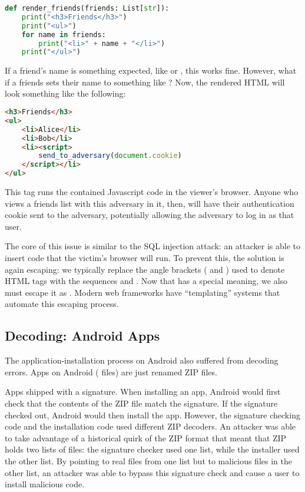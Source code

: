 \begin{lstlisting}[language=python]
def render_friends(friends: List[str]):
	print("<h3>Friends</h3>")
	print("<ul>")
	for name in friends:
		print("<li>" + name + "</li>")
	print("</ul>")
\end{lstlisting}

If a friend's name is something expected, like  or , this works fine. However, what if a friends sets their name to something like ? Now, the rendered HTML will look something like the following:

\begin{lstlisting}[language=html]
<h3>Friends</h3>	
<ul>
	<li>Alice</li>
	<li>Bob</li>
	<li><script>
		send_to_adversary(document.cookie)
	</script></li>
</ul>
\end{lstlisting}

This  tag runs the contained Javascript code in the viewer's browser. Anyone who views a friends list with this adversary in it, then, will have their authentication cookie sent to the adversary, potentially allowing the adversary to log in as that user.

The core of this issue is similar to the SQL injection attack: an attacker is
able to insert code that the victim's browser will run. To prevent this, the solution is again
escaping: we typically replace the angle brackets (\ttt{<} and \ttt{>}) used to denote HTML tags 
with the sequences  and . Now
that \ttt{&} has a special meaning, we also must escape it as .
Modern web frameworks have ``templating'' systems that automate this escaping process.


\subsection{Decoding: Android Apps}
The application-installation process on Android also suffered from decoding errors. Apps on Android ( files) are just renamed ZIP files.

Apps shipped with a signature. When installing an app, Android would first check that the contents of the ZIP file match the signature. If the signature checked out, Android would then install the app. However, the signature checking code and the installation code used different ZIP decoders. An attacker was able to take advantage of a historical quirk of the ZIP format that meant that ZIP holds two lists of files: the signature checker used one list, while the installer used the other list. By pointing to real files from one list but to malicious files in the other list, an attacker was able to bypass this signature check and cause a user to install malicious code.

